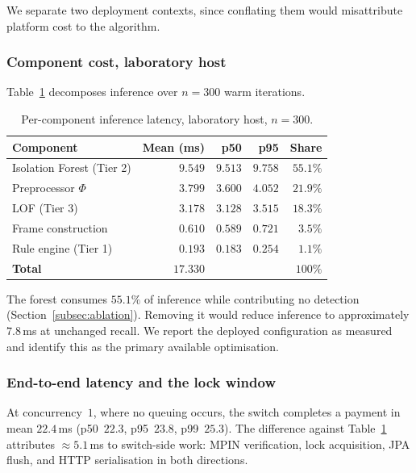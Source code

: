 \documentclass[conference]{IEEEtran}
\begin{document}
We separate two deployment contexts, since conflating them would
misattribute platform cost to the algorithm.

\subsubsection{Component cost, laboratory host}
Table~\ref{tab:components} decomposes inference over $n=300$ warm
iterations.

\begin{table}[t]
\centering
\caption{Per-component inference latency, laboratory host, $n=300$.}
\label{tab:components}
\renewcommand{\arraystretch}{1.2}
\footnotesize
\begin{tabular}{@{}lrrrr@{}}
\toprule
\textbf{Component} & \textbf{Mean (ms)} & \textbf{p50} & \textbf{p95} & \textbf{Share} \\
\midrule
Isolation Forest (Tier 2) & $9.549$ & $9.513$ & $9.758$ & $55.1\%$ \\
Preprocessor $\Phi$       & $3.799$ & $3.600$ & $4.052$ & $21.9\%$ \\
LOF (Tier 3)              & $3.178$ & $3.128$ & $3.515$ & $18.3\%$ \\
Frame construction        & $0.610$ & $0.589$ & $0.721$ & $3.5\%$ \\
Rule engine (Tier 1)      & $0.193$ & $0.183$ & $0.254$ & $1.1\%$ \\
\midrule
\textbf{Total}            & $\mathbf{17.330}$ & & & $100\%$ \\
\bottomrule
\end{tabular}
\end{table}

The forest consumes $55.1\%$ of inference while contributing no
detection (Section~\ref{subsec:ablation}). Removing it would reduce
inference to approximately $7.8$\,ms at unchanged recall. We report the
deployed configuration as measured and identify this as the primary
available optimisation.

\subsubsection{End-to-end latency and the lock window}
At concurrency~$1$, where no queuing occurs, the switch completes a
payment in mean $22.4$\,ms (p50~$22.3$, p95~$23.8$, p99~$25.3$). The
difference against Table~\ref{tab:components} attributes
$\approx 5.1$\,ms to switch-side work: MPIN verification, lock
acquisition, JPA flush, and HTTP serialisation in both directions.
\end{document}
